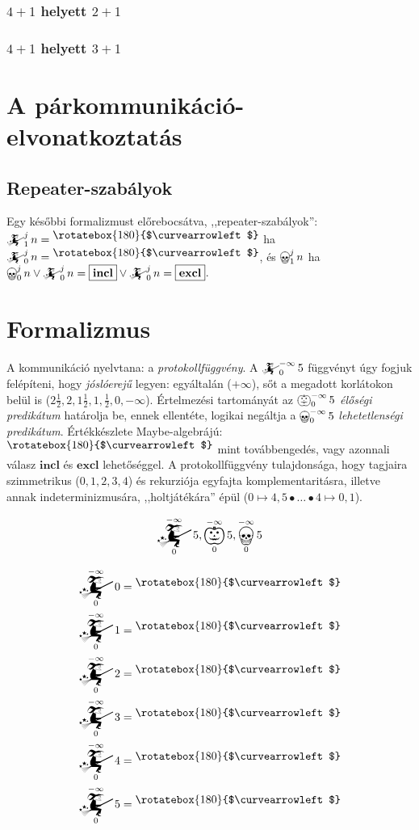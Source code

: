 \documentclass{article}
\newcommand{\nothing}{\text{\raisebox{0.4em}{\rotatebox{180}{$\curvearrowleft$}}}}%
\newcommand{\just}[1]{\boxed{#1}}%
\newcommand{\incl}{\mathbf{incl}}
\newcommand{\excl}{\mathbf{excl}}
\newcommand{\mainfun}[3]{\mathwitch_{#1}^{#2}#3}
\newcommand{\yesmainfun}[3]{\bigpumpkin_{#1}^{#2}#3}
\newcommand{\nomainfun}[3]{\bigskull_{#1}^{#2}#3}
\begin{document}
	\subsubsection{$4 + 1$ helyett $2 +1$}
	\subsubsection{$4 + 1$ helyett $3 +1$}


	\section{A párkommunikáció-elvonatkoztatás}

	\subsection{Repeater-szabályok}

	Egy későbbi formalizmust előrebocsátva, ,,repeater-szabályok'': $\mainfun1jn = \nothing$ ha $\mainfun0jn = \nothing$, és $\nomainfun1jn$ ha $\nomainfun0jn \lor \mainfun0jn = \just\incl \lor \mainfun0jn = \just\excl$.

	\section{Formalizmus}

	A kommunikáció nyelvtana: a \emph{protokollfüggvény}. A $\mainfun0{-\infty}5$ függvényt úgy fogjuk felépíteni, hogy \emph{jóslóerejű} legyen: egyáltalán ($+\infty$), sőt a megadott korlátokon belül is ($2\frac12, 2, 1\frac12, 1, \frac12, 0, -\infty$). Értelmezési tartományát az $\yesmainfun0{-\infty}5$ \emph{élőségi predikátum} határolja be, ennek ellentéte, logikai negáltja a $\nomainfun0{-\infty}5$ \emph{lehetetlenségi predikátum}. Értékkészlete Maybe-algebrájú: $\nothing$ mint továbbengedés, vagy azonnali válasz $\just\incl$ és $\just\excl$ lehetőséggel. A protokollfüggvény tulajdonsága, hogy tagjaira szimmetrikus ($0, 1, 2, 3,4$) és rekurziója egyfajta komplementaritásra, illetve annak indeterminizmusára, ,,holtjátékára'' épül ($0 \mapsto 4, 5 \bullet \dots \bullet 4 \mapsto 0, 1$).

	\[\mainfun0{-\infty}5, \yesmainfun0{-\infty}5, \nomainfun0{-\infty}5\]

	\begin{align*}
		\mainfun0{-\infty}0 &= \nothing \\
		\mainfun0{-\infty}1 &= \nothing \\
		\mainfun0{-\infty}2 &= \nothing \\
		\mainfun0{-\infty}3 &= \nothing \\
		\mainfun0{-\infty}4 &= \nothing \\
		\mainfun0{-\infty}5 &= \nothing
	\end{align*}
\end{document}
